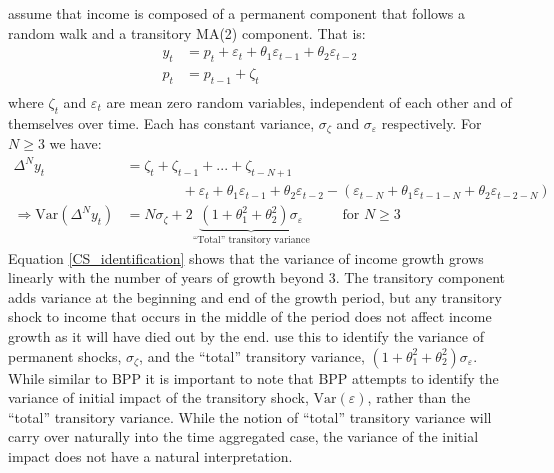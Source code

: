 \documentclass[titlepage]{\econtex}\newcommand{\texname}{ConsumptionHeterogeneity}
\begin{document}
\cite{carroll_nature_1997} assume that income is composed of a permanent component that follows a random walk and a transitory MA(2) component. That is:
	\begin{align*}
	y_t &= p_t + \varepsilon_t + \theta_1 \varepsilon_{t-1} + \theta_2 \varepsilon_{t-2} \\
	p_t &= p_{t-1} +\zeta_t\\
	\end{align*}
where $\zeta_t$ and $\varepsilon_t$ are mean zero random variables, independent of each other and of themselves over time. Each has constant variance, $\sigma_{\zeta}$ and $\sigma_{\varepsilon}$ respectively. For $N \geq 3$ we have:
\begin{align}
\Delta^N y_t &= \zeta_t + \zeta_{t-1} + ... + \zeta_{t-N+1} \nonumber \\
& \qquad \qquad + \varepsilon_t + \theta_1 \varepsilon_{t-1} + \theta_2 \varepsilon_{t-2} - (\varepsilon_{t-N} + \theta_1 \varepsilon_{t-1-N} + \theta_2 \varepsilon_{t-2-N}) \nonumber \\ 
\Rightarrow \mathrm{Var}(\Delta^N y_t) &= N \sigma_{\zeta} + 2\underbrace{(1+\theta_1^2 + \theta_2^2)\sigma_{\varepsilon}}_\text{``Total'' transitory variance} \qquad \text{ for $N \geq 3$} \label{CS_identification}
\end{align}
Equation \ref{CS_identification} shows that the variance of income growth grows linearly with the number of years of growth beyond 3. The transitory component adds variance at the beginning and end of the growth period, but any transitory shock to income that occurs in the middle of the period does not affect income growth as it will have died out by the end. \cite{carroll_nature_1997} use this to identify the variance of permanent shocks, $\sigma_{\zeta}$, and the ``total'' transitory variance, $(1+\theta_1^2 + \theta_2^2)\sigma_{\varepsilon}$. While similar to BPP it is important to note that BPP attempts to identify the variance of initial impact of the transitory shock, $\mathrm{Var}(\varepsilon)$, rather than the ``total'' transitory variance. While the notion of ``total'' transitory variance will carry over naturally into the time aggregated case, the variance of the initial impact does not have a natural interpretation.
\end{document}
